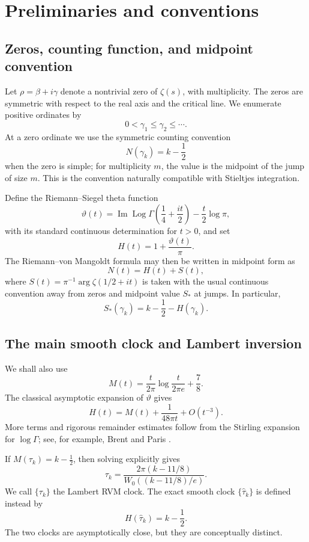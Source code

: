 \documentclass[11pt]{article}
\theoremstyle{definition}
\theoremstyle{remark}
\newcommand{\Log}{\operatorname{Log}}
\begin{document}
\section{Preliminaries and conventions}\label{sec:prelim}

\subsection{Zeros, counting function, and midpoint convention}
Let $\rho=\beta+i\gamma$ denote a nontrivial zero of $\zeta(s)$, with multiplicity.  The zeros are symmetric with respect to the real axis and the critical line.  We enumerate positive ordinates by
\[
0<\gamma_1\leq\gamma_2\leq\cdots.
\]
At a zero ordinate we use the symmetric counting convention
\[
N(\gamma_k)=k-\frac12
\]
when the zero is simple; for multiplicity $m$, the value is the midpoint of the jump of size $m$.  This is the convention naturally compatible with Stieltjes integration.

Define the Riemann--Siegel theta function
\[
\vartheta(t)=\operatorname{Im}\Log\Gamma\!\left(\frac14+\frac{it}{2}\right)-\frac t2\log\pi,
\]
with its standard continuous determination for $t>0$, and set
\[
H(t)=1+\frac{\vartheta(t)}{\pi}.
\]
The Riemann--von Mangoldt formula may then be written in midpoint form as
\[
N(t)=H(t)+S(t),
\]
where $S(t)=\pi^{-1}\arg\zeta(1/2+it)$ is taken with the usual continuous convention away from zeros and midpoint value $S_*$ at jumps.  In particular,
\begin{equation}\label{eq:midpoint}
S_*(\gamma_k)=k-\frac12-H(\gamma_k).
\end{equation}

\subsection{The main smooth clock and Lambert inversion}
We shall also use
\begin{equation}\label{eq:Mclock}
M(t)=\frac{t}{2\pi}\log\frac{t}{2\pi e}+\frac78.
\end{equation}
The classical asymptotic expansion of $\vartheta$ gives
\begin{equation}\label{eq:HminusM}
H(t)=M(t)+\frac{1}{48\pi t}+O(t^{-3}).
\end{equation}
More terms and rigorous remainder estimates follow from the Stirling expansion for $\log\Gamma$; see, for example, Brent and Paris \cite{Brent2018,Paris2020}.

If $M(\tau_k)=k-\tfrac12$, then solving explicitly gives
\begin{equation}\label{eq:Lambertinverse}
\boxed{
\tau_k=\frac{2\pi(k-11/8)}{W_0((k-11/8)/e)}.
}
\end{equation}
We call $\{\tau_k\}$ the Lambert RVM clock.  The exact smooth clock $\{\widehat\tau_k\}$ is defined instead by
\[
H(\widehat\tau_k)=k-\frac12.
\]
The two clocks are asymptotically close, but they are conceptually distinct.
\end{document}
